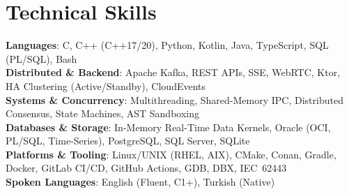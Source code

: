 \documentclass[a4paper,10pt]{article}
\begin{document}
\section{Technical Skills}
 \begin{itemize}[leftmargin=0.10in, label={}, topsep=1pt, itemsep=1pt, parsep=0pt]
    \small{\item{
     \textbf{Languages}{: C, C++ (C++17/20), Python, Kotlin, Java, TypeScript, SQL (PL/SQL), Bash} \\
     \textbf{Distributed \& Backend}{: Apache Kafka, REST APIs, SSE, WebRTC, Ktor, HA Clustering (Active/Standby), CloudEvents} \\
     \textbf{Systems \& Concurrency}{: Multithreading, Shared-Memory IPC, Distributed Consensus, State Machines, AST Sandboxing} \\
     \textbf{Databases \& Storage}{: In-Memory Real-Time Data Kernels, Oracle (OCI, PL/SQL, Time-Series), PostgreSQL, SQL Server, SQLite} \\
     \textbf{Platforms \& Tooling}{: Linux/UNIX (RHEL, AIX), CMake, Conan, Gradle, Docker, GitLab CI/CD, GitHub Actions, GDB, DBX, IEC~62443} \\
     \textbf{Spoken Languages}{: English (Fluent, C1+), Turkish (Native)}
    }}
 \end{itemize}

\end{document}
